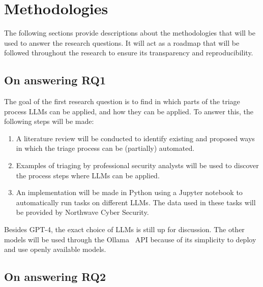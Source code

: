 \section{Methodologies}
\label{sec:methodologies}

The following sections provide descriptions about the methodologies that will be used to answer the research questions.
It will act as a roadmap that will be followed throughout the research to ensure its transparency and reproducibility.


\subsection{On answering RQ1}
\label{subsec:on-answering-rq1}

The goal of the first research question is to find in which parts of the triage process LLMs can be applied, and how
they can be applied.
To answer this, the following steps will be made:

\begin{enumerate}
    \item A literature review will be conducted to identify existing and proposed ways in which the triage process can
    be (partially) automated.
    \item Examples of triaging by professional security analysts will be used to discover the process steps where LLMs
    can be applied.
    \item An implementation will be made in Python using a Jupyter notebook to automatically run tasks on different
    LLMs.
    The data used in these tasks will be provided by Northwave Cyber Security.
\end{enumerate}

Besides GPT-4, the exact choice of LLMs is still up for discussion.
The other models will be used through the Ollama\ \citep{ollama} API because of its simplicity to deploy and use openly
available models.


\subsection{On answering RQ2}
\label{subsec:on-answering-rq2}

